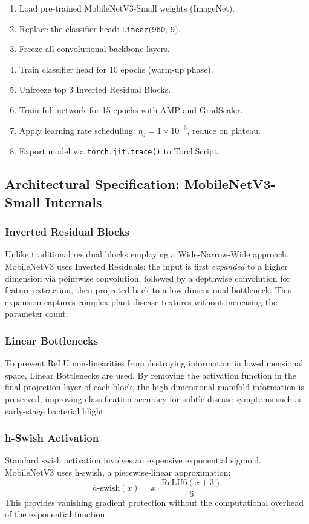 \documentclass[12pt,oneside]{report}
\begin{document}
\begin{enumerate}
    \item Load pre-trained MobileNetV3-Small weights (ImageNet).
    \item Replace the classifier head: $\texttt{Linear(960, 9)}$.
    \item Freeze all convolutional backbone layers.
    \item Train classifier head for 10 epochs (warm-up phase).
    \item Unfreeze top 3 Inverted Residual Blocks.
    \item Train full network for 15 epochs with AMP and GradScaler.
    \item Apply learning rate scheduling: $\eta_0 = 1 \times 10^{-3}$, reduce on plateau.
    \item Export model via \texttt{torch.jit.trace()} to TorchScript.
\end{enumerate}

\subsection{Architectural Specification: MobileNetV3-Small Internals}

\subsubsection{Inverted Residual Blocks}
Unlike traditional residual blocks employing a Wide-Narrow-Wide approach, MobileNetV3 uses Inverted Residuals: the input is first \textit{expanded} to a higher dimension via pointwise convolution, followed by a depthwise convolution for feature extraction, then projected back to a low-dimensional bottleneck. This expansion captures complex plant-disease textures without increasing the parameter count.

\subsubsection{Linear Bottlenecks}
To prevent ReLU non-linearities from destroying information in low-dimensional space, Linear Bottlenecks are used. By removing the activation function in the final projection layer of each block, the high-dimensional manifold information is preserved, improving classification accuracy for subtle disease symptoms such as early-stage bacterial blight.

\subsubsection{h-Swish Activation}
Standard swish activation involves an expensive exponential sigmoid. MobileNetV3 uses h-swish, a piecewise-linear approximation:
\begin{equation}
    h\text{-swish}(x) = x \cdot \frac{\text{ReLU6}(x + 3)}{6}
\end{equation}
This provides vanishing gradient protection without the computational overhead of the exponential function.
\end{document}
